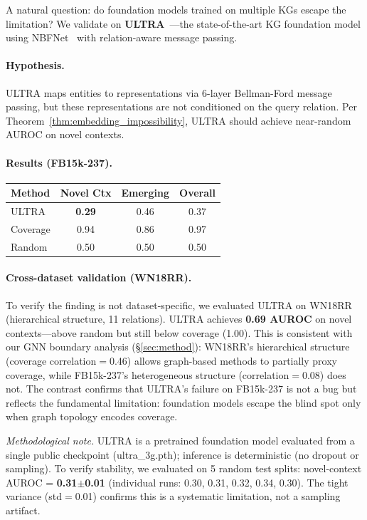 A natural question: do foundation models trained on multiple KGs escape the limitation? We validate on \textbf{ULTRA}~\citep{galkin2024ultra}---the state-of-the-art KG foundation model using NBFNet~\citep{zhu2021neural} with relation-aware message passing.

\paragraph{Hypothesis.} ULTRA maps entities to representations via 6-layer Bellman-Ford message passing, but these representations are not conditioned on the query relation. Per Theorem~\ref{thm:embedding_impossibility}, ULTRA should achieve near-random AUROC on novel contexts.

\paragraph{Results (FB15k-237).}

\begin{center}
\small
\begin{tabular}{lccc}
\toprule
Method & Novel Ctx & Emerging & Overall \\
\midrule
ULTRA & \textbf{0.29} & 0.46 & 0.37 \\
Coverage & 0.94 & 0.86 & 0.97 \\
Random & 0.50 & 0.50 & 0.50 \\
\bottomrule
\end{tabular}
\end{center}

\paragraph{Cross-dataset validation (WN18RR).}
To verify the finding is not dataset-specific, we evaluated ULTRA on WN18RR (hierarchical structure, 11 relations). ULTRA achieves \textbf{0.69 AUROC} on novel contexts---above random but still below coverage (1.00). This is consistent with our GNN boundary analysis (\S\ref{sec:method}): WN18RR's hierarchical structure (coverage correlation$=$0.46) allows graph-based methods to partially proxy coverage, while FB15k-237's heterogeneous structure (correlation$=$0.08) does not. The contrast confirms that ULTRA's failure on FB15k-237 is not a bug but reflects the fundamental limitation: foundation models escape the blind spot only when graph topology encodes coverage.

\noindent\textit{Methodological note.} ULTRA is a pretrained foundation model evaluated from a single public checkpoint (ultra\_3g.pth); inference is deterministic (no dropout or sampling). To verify stability, we evaluated on 5 random test splits: novel-context AUROC = \textbf{0.31$\pm$0.01} (individual runs: 0.30, 0.31, 0.32, 0.34, 0.30). The tight variance (std$=$0.01) confirms this is a systematic limitation, not a sampling artifact.

